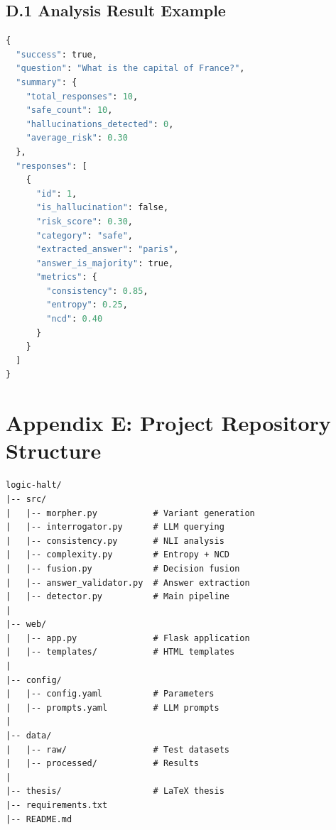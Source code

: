 \subsection*{D.1 Analysis Result Example}

\begin{lstlisting}[language=Python, caption={Sample analysis output}]
{
  "success": true,
  "question": "What is the capital of France?",
  "summary": {
    "total_responses": 10,
    "safe_count": 10,
    "hallucinations_detected": 0,
    "average_risk": 0.30
  },
  "responses": [
    {
      "id": 1,
      "is_hallucination": false,
      "risk_score": 0.30,
      "category": "safe",
      "extracted_answer": "paris",
      "answer_is_majority": true,
      "metrics": {
        "consistency": 0.85,
        "entropy": 0.25,
        "ncd": 0.40
      }
    }
  ]
}
\end{lstlisting}

\section*{Appendix E: Project Repository Structure}

\begin{lstlisting}[caption={Project directory structure}]
logic-halt/
|-- src/
|   |-- morpher.py           # Variant generation
|   |-- interrogator.py      # LLM querying
|   |-- consistency.py       # NLI analysis
|   |-- complexity.py        # Entropy + NCD
|   |-- fusion.py            # Decision fusion
|   |-- answer_validator.py  # Answer extraction
|   |-- detector.py          # Main pipeline
|
|-- web/
|   |-- app.py               # Flask application
|   |-- templates/           # HTML templates
|
|-- config/
|   |-- config.yaml          # Parameters
|   |-- prompts.yaml         # LLM prompts
|
|-- data/
|   |-- raw/                 # Test datasets
|   |-- processed/           # Results
|
|-- thesis/                  # LaTeX thesis
|-- requirements.txt
|-- README.md
\end{lstlisting}

\clearpage
